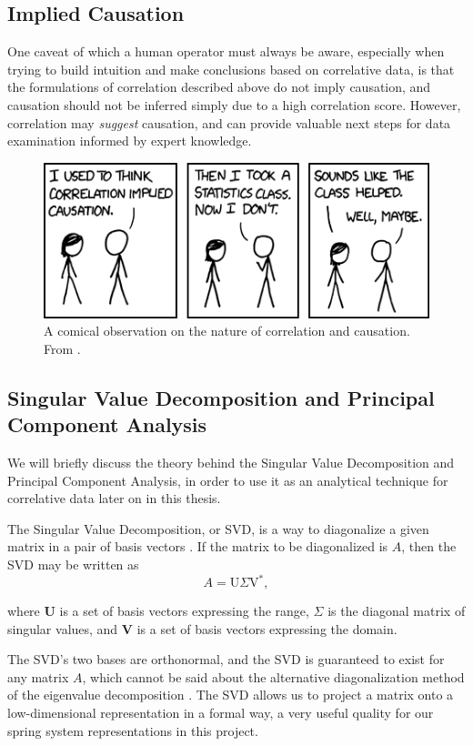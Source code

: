 \subsection{Implied Causation}

One caveat of which a human operator must always be aware, especially when trying to build intuition and make conclusions based on correlative data, is that the formulations of correlation described above do not imply causation, and causation should not be inferred simply due to a high correlation score. However, correlation may \textit{suggest} causation, and can provide valuable next steps for data examination informed by expert knowledge.

\begin{figure}[h]
\centering
    \includegraphics[width=0.5\columnwidth]{images/xkcd_correlation.png}
    \caption{A comical observation on the nature of correlation and causation. From \cite{xkcd_correlation}.}
    \label{fig:xkcd_correction}
\end{figure}


\subsection{Singular Value Decomposition and Principal Component Analysis}

We will briefly discuss the theory behind the Singular Value Decomposition and Principal Component Analysis, in order to use it as an analytical technique for correlative data later on in this thesis.

The Singular Value Decomposition, or SVD, is a way to diagonalize a given matrix in a pair of basis vectors \cite{kutz2013data}. If the matrix to be diagonalized is $A$, then the SVD may be written as
\begin{equation} \label{eq:svd}
A = \text{U} \Sigma \text{V}^{*},
\end{equation}

where \textbf{U} is a set of basis vectors expressing the range, $\Sigma$ is the diagonal matrix of singular values, and \textbf{V} is a set of basis vectors expressing the domain.

The SVD's two bases are orthonormal, and the SVD is guaranteed to exist for any matrix $A$, which cannot be said about the alternative diagonalization method of the eigenvalue decomposition \cite{kutz2013data}. The SVD allows us to project a matrix onto a low-dimensional representation in a formal way, a very useful quality for our spring system representations in this project.

